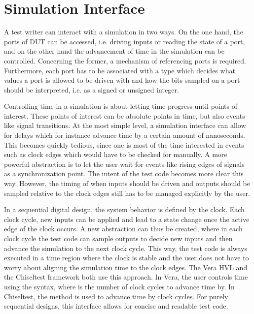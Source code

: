 \section{Simulation Interface} %

A test writer can interact with a simulation in two ways. On the one hand, the ports of DUT can be accessed, i.e.
driving inputs or reading the state of a port, and on the other hand the advancement of time in the simulation can be
controlled. Concerning the former, a mechanism of referencing ports is required. Furthermore, each port has to be
associated with a type which decides what values a port is allowed to be driven with and how the bits sampled on a
port should be interpreted, i.e. as a signed or unsigned integer.

Controlling time in a simulation is about letting time progress until points of interest. These points of interest can
be absolute points in time, but also events like signal transitions. At the most simple level, a simulation interface
can allow for delays which for instance advance time by a certain amount of nanoseconds. This becomes quickly
tedious, since one is most of the time interested in events such as clock edges which would have to be checked for
manually. A more powerful abstraction is to let the user wait for events like rising edges of signals as a
synchronization point. The intent of the test code becomes more clear this way. However, the timing of when inputs
should be driven and outputs should be sampled relative to the clock edges still has to be managed explicitly by the user.

In a sequential digital design, the system behavior is defined by the clock. Each clock cycle, new inputs can be
applied and lead to a state change once the active edge of the clock occurs. A new abstraction can thus be created,
where in each clock cycle the test code can sample outputs to decide new inputs and then advance the simulation to
the next clock cycle. This way, the test code is always executed in a time region where the clock is stable and the
user does not have to worry about aligning the simulation time to the clock edges. The Vera \cite[Sec. 7]{flake2020a}
HVL and the Chiseltest \cite{chiseltest} framework both use this approach. In Vera, the user controls time using the
 syntax, where  is the number of clock cycles to advance time by. In Chiseltest, the
 method is used to advance time by  clock cycles. For purely sequential designs, this
interface allows for concise and readable test code.

